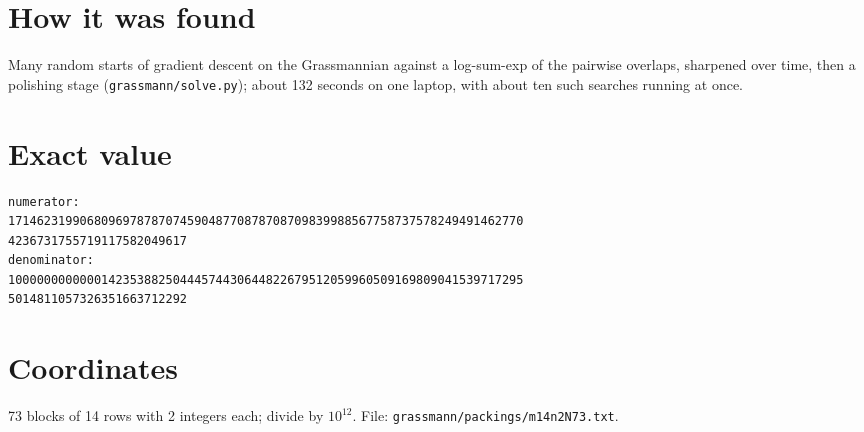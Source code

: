 \documentclass[11pt,a4paper]{article}
\begin{document}
\section{How it was found}
Many random starts of gradient descent on the Grassmannian against a log-sum-exp of the pairwise overlaps, sharpened over time, then a polishing stage (\texttt{grassmann/solve.py}); about 132 seconds on one laptop, with about ten such searches running at once.


\appendix
\section{Exact value}
{\small
\begin{verbatim}
numerator:
171462319906809697878707459048770878708709839988567758737578249491462770
4236731755719117582049617
denominator:
100000000000014235388250444574430644822679512059960509169809041539717295
5014811057326351663712292
\end{verbatim}}

\section{Coordinates}
73 blocks of 14 rows with 2 integers each; divide by $10^{12}$. File: \texttt{grassmann/packings/m14n2N73.txt}.
{\tiny
\begin{multicols}{4}
\end{multicols}}
\end{document}
